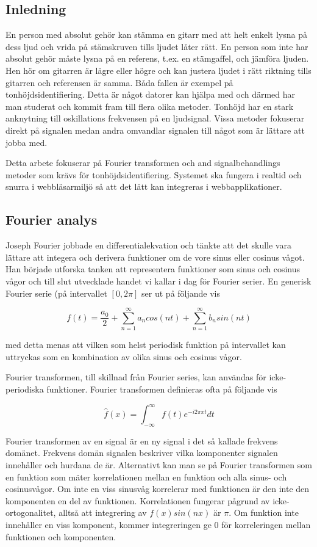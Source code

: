 \subsection{Inledning}
En person med absolut gehör kan stämma en gitarr med att helt enkelt lysna på dess ljud och vrida på stämskruven tills ljudet låter rätt. En person som inte har absolut gehör måste lysna på en referens, t.ex. en stämgaffel, och jämföra ljuden. Hen hör om gitarren är lägre eller högre och kan justera ljudet i rätt riktning tills gitarren och referensen är samma. Båda fallen är exempel på tonhöjdsidentifiering. Detta är något datorer kan hjälpa med och därmed har man studerat och kommit fram till flera olika metoder. Tonhöjd har en stark anknytning till oskillations frekvensen på en ljudsignal. Vissa metoder fokuserar direkt på signalen medan andra omvandlar signalen till något som är lättare att jobba med.

Detta arbete fokuserar på Fourier transformen och and signalbehandlings metoder som krävs för tonhöjdsidentifiering. Systemet ska fungera i realtid och snurra i webbläsarmiljö så att det lätt kan integreras i webbapplikationer.

\subsection{Fourier analys}
Joseph Fourier jobbade en differentialekvation och tänkte att det skulle vara lättare att integera och derivera funktioner om de vore sinus eller cosinus vågot. Han började utforska tanken att representera funktioner som sinus och cosinus vågor och till slut utvecklade handet vi kallar i dag för Fourier serier. En generisk Fourier serie (på intervallet $[0, 2\pi]$ ser ut på följande vis

$$f(t) = \frac{a_0}{2} + \sum_{n=1}^{\infty}a_ncos(nt)+\sum_{n=1}^{\infty}b_nsin(nt)$$

med detta menas att vilken som helst periodisk funktion på intervallet kan uttryckas som en
kombination av olika sinus och cosinus vågor. 

Fourier transformen, till skillnad från Fourier series, kan användas för icke-periodiska funktioner. Fourier transformen definieras ofta på följande vis

$$\hat{f}(x) = \int_{-\infty}^{\infty} f(t)e^{-i2\pi x t} dt$$

Fourier transformen av en signal är en ny signal i det så kallade frekvens domänet. Frekvens domän signalen beskriver vilka komponenter signalen innehåller och hurdana de är. Alternativt kan man se på Fourier transformen som en funktion som mäter korrelationen mellan en funktion och alla sinus- och cosinusvågor. Om inte en viss sinusvåg korrelerar med funktionen
är den inte den komponenten en del av funktionen. Korrelationen fungerar pågrund av icke-ortogonalitet, alltså att integrering av $f(x)sin(nx)$ är $\pi$. Om funktion inte innehåller en viss komponent, kommer integreringen ge $0$ för korreleringen mellan funktionen och komponenten.

